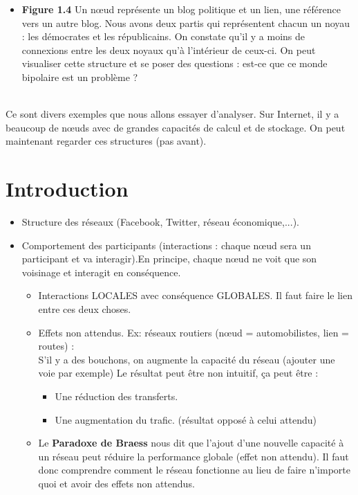 \begin{itemize}
	\item \textbf{Figure 1.4} Un nœud représente un blog politique et un lien, une référence vers un autre blog. Nous avons deux partis qui représentent chacun un noyau : les démocrates et les républicains. On constate qu'il y a moins de connexions entre les deux noyaux qu'à l'intérieur de ceux-ci. On peut visualiser cette structure et se poser des questions : est-ce que ce monde bipolaire est un problème ?\\\
\end{itemize}

Ce sont divers exemples que nous allons essayer d'analyser. Sur Internet, il y a beaucoup de nœuds avec de grandes capacités de calcul et de stockage. On peut maintenant regarder ces structures (pas avant). 
\section{Introduction}
\begin{itemize}
\item Structure des réseaux (Facebook, Twitter, réseau économique,...).
\item Comportement des participants (interactions : chaque nœud sera un participant et va interagir).En principe, chaque nœud ne voit que son voisinage et interagit en conséquence.
\begin{itemize}


	\item Interactions LOCALES avec conséquence GLOBALES.
	Il faut faire le lien entre ces deux choses.
	\item Effets non attendus. Ex: réseaux routiers (nœud = automobilistes, lien = routes) : \\
	S'il y a des bouchons, on augmente la capacité du réseau (ajouter une voie par exemple)
	Le résultat peut être non intuitif, ça peut être :
	\begin{itemize} 
		\item Une réduction des transferts.
		\item Une augmentation du trafic. (résultat opposé à celui attendu)
	\end{itemize}	
	\item Le \textbf{Paradoxe de Braess} nous dit que l'ajout d'une nouvelle capacité à un réseau peut réduire la performance globale (effet non attendu).
Il faut donc comprendre comment le réseau fonctionne au lieu de faire n'importe quoi et avoir des effets non attendus.
\end{itemize}
\end{itemize}
